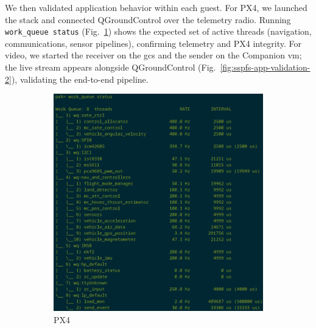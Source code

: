 We then validated application behavior within each guest. For PX4, we launched
the stack and connected QGroundControl over the telemetry radio. Running
\lstinline{work_queue status} (Fig.~\ref{fig:sspfs-app-validation-1}) shows the
expected set of active threads (navigation, communications, sensor pipelines),
confirming telemetry and PX4 integrity. For video, we started the receiver on
the \gls{gcs} and the sender on the Companion \gls{vm}; the live stream appears
alongside QGroundControl (Fig.~\ref{fig:sspfs-app-validation-2}), validating the
end-to-end pipeline.

\begin{figure}[!hbt]
  \centering
  \begin{subfigure}[t]{0.49\textwidth}
    \centering
    \includegraphics[width=1.0\textwidth]{./img/png/sspfs-px4-validation}
    \caption{PX4}%
    \label{fig:sspfs-app-validation-1}
  \end{subfigure}
  \begin{subfigure}[t]{0.49\textwidth}
    \centering

\end{subfigure}
\end{figure}

